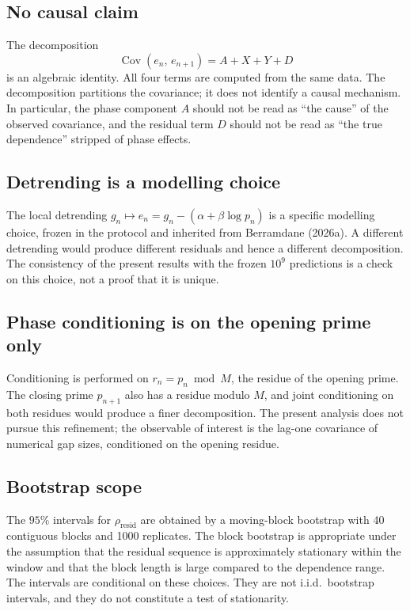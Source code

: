 \subsection{No causal claim}

The decomposition
\[
\operatorname{Cov}(e_n,\,e_{n+1}) = A + X + Y + D
\]
is an algebraic identity. All four terms are computed from the same data. The decomposition partitions the covariance; it does not identify a causal mechanism. In particular, the phase component $A$ should not be read as ``the cause'' of the observed covariance, and the residual term $D$ should not be read as ``the true dependence'' stripped of phase effects.

\subsection{Detrending is a modelling choice}

The local detrending $g_n \mapsto e_n = g_n - (\alpha + \beta\log p_n)$ is a specific modelling choice, frozen in the protocol and inherited from Berramdane (2026a). A different detrending would produce different residuals and hence a different decomposition. The consistency of the present results with the frozen $10^9$ predictions is a check on this choice, not a proof that it is unique.

\subsection{Phase conditioning is on the opening prime only}

Conditioning is performed on $r_n = p_n \bmod M$, the residue of the opening prime. The closing prime $p_{n+1}$ also has a residue modulo $M$, and joint conditioning on both residues would produce a finer decomposition. The present analysis does not pursue this refinement; the observable of interest is the lag-one covariance of numerical gap sizes, conditioned on the opening residue.

\subsection{Bootstrap scope}

The $95\%$ intervals for $\rho_{\text{resid}}$ are obtained by a moving-block bootstrap with 40 contiguous blocks and 1000 replicates. The block bootstrap is appropriate under the assumption that the residual sequence is approximately stationary within the window and that the block length is large compared to the dependence range. The intervals are conditional on these choices. They are not i.i.d.\ bootstrap intervals, and they do not constitute a test of stationarity.


